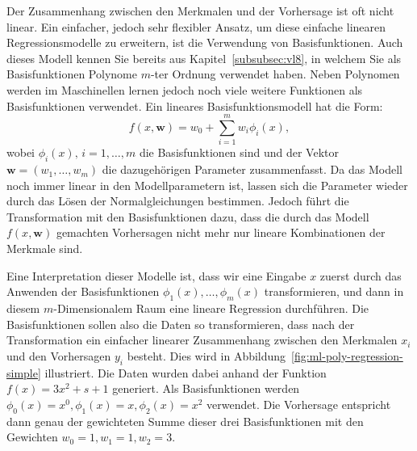 Der Zusammenhang zwischen den Merkmalen und der Vorhersage ist oft nicht linear.
Ein einfacher, jedoch sehr flexibler Ansatz, um diese einfache linearen Regressionsmodelle zu erweitern, ist die Verwendung von Basisfunktionen. Auch dieses Modell kennen Sie bereits aus Kapitel~\ref{subsubsec:vl8}, in welchem Sie als Basisfunktionen Polynome $m$-ter Ordnung verwendet haben. Neben Polynomen werden im Maschinellen lernen jedoch noch viele weitere 
Funktionen als Basisfunktionen verwendet. 
Ein lineares Basisfunktionsmodell hat die Form:
\[
    f(x, \textbf{w}) = w_0 + \sum_{i=1}^m w_i \phi_i(x),
\]
wobei $\phi_i(x), \, i = 1, \ldots, m$ die Basisfunktionen sind und der 
Vektor $\textbf{w}=(w_1, \ldots, w_m)$ die dazugehörigen Parameter zusammenfasst. 
Da das Modell noch immer linear in den Modellparametern ist, lassen sich die Parameter wieder durch das Lösen der Normalgleichungen bestimmen. Jedoch führt die Transformation mit den Basisfunktionen dazu, dass die durch das Modell $f(x, \textbf{w})$ gemachten Vorhersagen nicht mehr nur lineare Kombinationen der Merkmale sind. 

Eine Interpretation dieser Modelle ist, dass wir eine Eingabe $x$ zuerst durch das Anwenden der Basisfunktionen $\phi_1(x), \ldots, \phi_m(x)$ transformieren, und dann in diesem $m$-Dimensionalem Raum eine lineare Regression durchführen. Die Basisfunktionen sollen also die Daten so transformieren, dass nach der Transformation ein 
einfacher linearer Zusammenhang zwischen den Merkmalen $x_i$ und den Vorhersagen $y_i$ besteht. 
Dies wird in Abbildung~\ref{fig:ml-poly-regression-simple} illustriert. Die Daten wurden dabei anhand der Funktion $f(x) = 3 x^2 + s + 1$ generiert. Als Basisfunktionen werden $\phi_0(x)=x^0, \phi_1(x) = x, \phi_2(x)=x^2$ verwendet. Die Vorhersage entspricht dann genau der gewichteten Summe dieser drei Basisfunktionen mit den Gewichten $w_0 = 1, w_1=1, w_2 = 3$.

